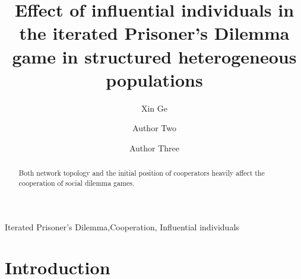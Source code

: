 \documentclass[preprint,12pt,3p]{elsarticle}
\begin{document}
\begin{frontmatter}

\title{Effect of influential individuals in the iterated Prisoner's Dilemma game in structured heterogeneous populations}

\author[label1]{Xin Ge}
\address[label1]{DaLian Maritime University, School of Information Science and
technology, DaLian 116026, P.R. China}
\address[label2]{Address Two}



\author[label5]{Author Two}
\address[label5]{Some University}

\author[label1,label5]{Author Three}

\begin{abstract}
Both network topology and the initial position of cooperators heavily affect the cooperation of social dilemma games.
\end{abstract}

\begin{keyword}
Iterated Prisoner’s Dilemma,Cooperation, Influential individuals
\end{keyword}

\end{frontmatter}

\newcommand{\cooplevel}{Asymptotic density of cooperators $\mathcal{C}$ on the T-S plane}

\section{Introduction}
\end{document}
